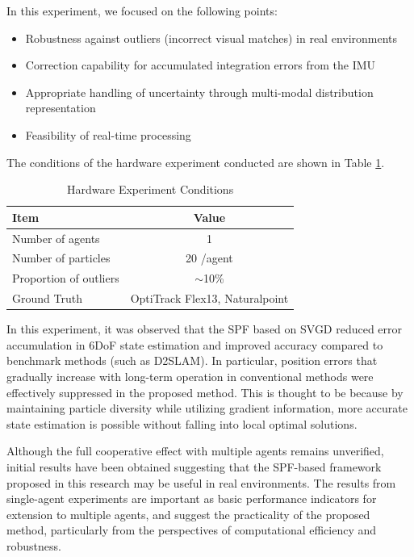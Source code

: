 \documentclass[a4paper,fleqn,10pt,twocolumn]{SICE_ISCS}
\begin{document}
In this experiment, we focused on the following points:
\begin{itemize}
\item Robustness against outliers (incorrect visual matches) in real environments
\item Correction capability for accumulated integration errors from the IMU
\item Appropriate handling of uncertainty through multi-modal distribution representation
\item Feasibility of real-time processing
\end{itemize}

The conditions of the hardware experiment conducted are shown in Table \ref{tb:sim3}.

\begin{table}[h]
\caption{Hardware Experiment Conditions}
  \centering
  \begin{tabular}{l|c} \hline
    Item & Value  \\ \hline
    Number of agents & 1  \\
    Number of particles & 20 /agent  \\
    Proportion of outliers & $\sim$10\% \\
    Ground Truth & OptiTrack Flex13, Naturalpoint \\ \hline
  \end{tabular}
  \label{tb:sim3}
\end{table}

In this experiment, it was observed that the SPF based on SVGD reduced error accumulation in 6DoF state estimation and improved accuracy compared to benchmark methods (such as D2SLAM). In particular, position errors that gradually increase with long-term operation in conventional methods were effectively suppressed in the proposed method. This is thought to be because by maintaining particle diversity while utilizing gradient information, more accurate state estimation is possible without falling into local optimal solutions.

Although the full cooperative effect with multiple agents remains unverified, initial results have been obtained suggesting that the SPF-based framework proposed in this research may be useful in real environments. The results from single-agent experiments are important as basic performance indicators for extension to multiple agents, and suggest the practicality of the proposed method, particularly from the perspectives of computational efficiency and robustness.
\end{document}
